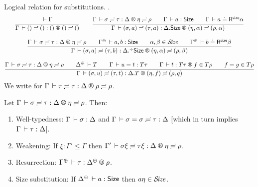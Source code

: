 \documentclass[acmlarge,review,anonymous]{acmart}\settopmatter{printfolios=true}
\newcommand{\LONGVERSION}[1]{}
\begin{document}
Logical relation for substitutions.
\fbox{$\LRSub \Gamma \sigma \tau \Delta \eta \rho$}.
\begin{gather*}
  \ru{\der \Gamma
    }{\LRSub \Gamma {\sempty} {\sempty} {\cempty} {\sempty} {\sempty}}
\qquad
  \ru{\LRSub \Gamma \sigma \tau \Delta \eta \rho \qquad
      \Gamma \der a : \Size \qquad
      \LRSize \Gamma a \alpha
    }{\LRSub \Gamma {(\sigma,a)} {(\tau,a)} {\cext \Delta \Size} {(\eta,\alpha)} {(\rho,\alpha)}}
\\[2ex]
  \ru{\LRSub \Gamma \sigma \tau \Delta \eta \rho \qquad
      \resurrect \Gamma \der a, b : \Size \qquad
      \alpha,\beta \in \SIZE \qquad
      \LRSize {\resurrect\Gamma} b \beta
    }{\LRSub \Gamma {(\sigma,a)} {(\tau,b)} {\erext \Delta \Size} {(\eta,\alpha)} {(\rho,\beta)}}
\\[2ex]
  \ru{\LRSub \Gamma \sigma \tau \Delta \eta \rho \qquad
      \resurrect \Delta \der T \qquad
      \Gamma \der u = t : T\tau \qquad
      \LR \Gamma t {T \tau} f {T \rho} \qquad
      f = g \in T\rho
    }{\LRSub \Gamma {(\sigma,u)} {(\tau,t)} {\cext \Delta T} {(\eta,f)} {(\rho,q)}}
\end{gather*}
We write \fbox{$\LRS \Gamma \tau \Delta \rho$} for $\LRSub \Gamma \tau \tau \Delta \rho \rho$.

\begin{lemma}
  \label{lem:wklrsub}
  Let $\LRSub \Gamma \sigma \tau \Delta \eta \rho$. Then:
  \begin{enumerate}
  \item Well-typedness: $\Gamma \,\vdash \sigma : \Delta$
   and $\Gamma \,\vdash \sigma = \sigma \risingdotseq \tau : \Delta$
   [which in turn implies $\Gamma \,\vdash \tau : \Delta$].
  \item Weakening:
  If\/ $\xi : \Gamma' \leq \Gamma$ then
  $\LRSub{\Gamma'}{\sigma\xi}{\tau\xi}{\Delta}\eta\rho$.
  \item Resurrection:
  $\LRS {\resurrect\Gamma} \tau {\resurrect\Delta} \rho$.
  \item \label{it:sizesub} Size substitution:
  If\/ $\resurrect\Delta \der a : \Size$ then $a\eta \in \mathcal{S}\!\mathit{ize}$.
  \end{enumerate}
\end{lemma}
\LONGVERSION{
\begin{proof}
  For part (\ref{it:sizesub}), the only interesting case $a = \ind i + o$ can be proved by observing that $\eta(i) \in \SIZE$.
\end{proof}
} %
\end{document}
